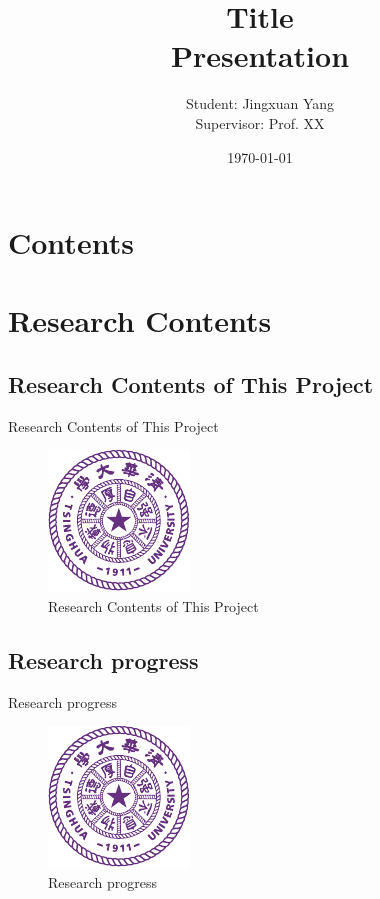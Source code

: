 \documentclass{beamer}
\title[Title]{Title\\[2mm] Presentation}
\author[Jingxuan Yang]{Student: Jingxuan Yang\\[5mm] Supervisor: Prof. XX}
\institute[Tsinghua University]{\small Tsinghua University}
\date{\small \vskip -10pt \today}
\begin{document}
\begin{frame}
	\maketitle
\end{frame}

\section*{Contents}
\frame{
  \frametitle{\secname}
  \tableofcontents[hideallsubsections]
}

\section{Research Contents}

\subsection{Research Contents of This Project}

\begin{frame}{Research Contents of This Project}
  \begin{figure}
    \includegraphics[width=0.4\linewidth]{thulogo}
    \caption{Research Contents of This Project}
  \end{figure}
\end{frame}

\subsection{Research progress}

\begin{frame}{Research progress}
  \begin{figure}
    \includegraphics[width=0.4\linewidth]{thulogo}
    \caption{Research progress}
  \end{figure}
\end{frame}
\end{document}
